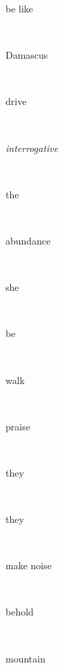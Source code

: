 \documentclass[a4paper]{article}
\begin{document}
\begin{multicols}{4}
\begin{multicols}{4}
\begin{multicols}{5}
{\hebrewfont{}} \begin{english}be like\end{english}\\
{\hebrewfont{}} \begin{english}Damascus\end{english}\\
{\hebrewfont{}} \begin{english}drive\end{english}\\
{\hebrewfont{}} \begin{english}\textit{interrogative}\end{english}\\
{\hebrewfont{}} \begin{english}the\end{english}\\
{\hebrewfont{}} \begin{english}abundance\end{english}\\
{\hebrewfont{}} \begin{english}she\end{english}\\
{\hebrewfont{}} \begin{english}be\end{english}\\
{\hebrewfont{}} \begin{english}walk\end{english}\\
{\hebrewfont{}} \begin{english}praise\end{english}\\
{\hebrewfont{}} \begin{english}they\end{english}\\
{\hebrewfont{}} \begin{english}they\end{english}\\
{\hebrewfont{}} \begin{english}make noise\end{english}\\
{\hebrewfont{}} \begin{english}behold\end{english}\\
{\hebrewfont{}} \begin{english}mountain\end{english}\\

\end{multicols}
\end{multicols}
\end{multicols}
\end{document}
